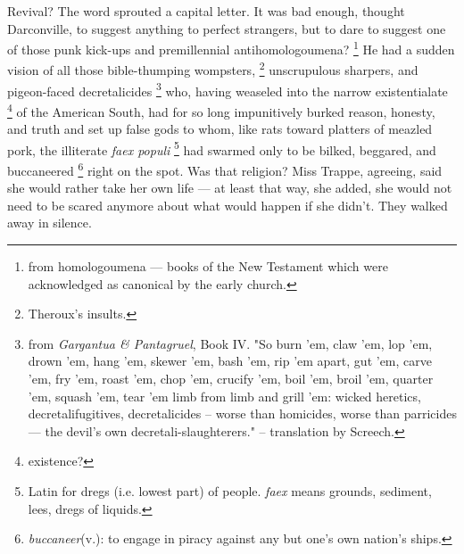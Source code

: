   Revival? The word sprouted a capital letter. It was bad enough, thought
Darconville, to suggest anything to perfect strangers, but to dare to suggest
one of those punk 
kick-ups and premillennial 
antihomologoumena? 
\footnote{ \textdbend from homologoumena --- books of the New Testament which 
  were acknowledged as canonical by the early church.}
He had a sudden vision of all those bible-thumping
wompsters, 
\footnote{ \textdbend Theroux's insults.}
unscrupulous 
sharpers, 
and pigeon-faced decretalicides 
\footnote{ from \textit{Gargantua \& Pantagruel}, Book IV. "So burn 'em, claw 
'em, lop 'em, drown 'em, hang 'em, skewer 'em, bash 'em, rip 'em apart, gut 'em, carve
'em, fry 'em, roast 'em, chop 'em, crucify 'em, boil 'em, broil 'em, quarter 'em,
squash 'em, tear 'em limb from limb and grill 'em: wicked heretics,
decretalifugitives, decretalicides -- worse than homicides, worse than parricides
--- the devil's own decretali-slaughterers." -- translation by Screech.}
who, having weaseled 
into the narrow existentialate
\footnote{\textdbend existence?}
of the American South, had for so long impunitively 
burked 
reason, honesty, and truth and set up false gods to whom, like rats toward platters 
of meazled 
pork, the illiterate \textit{faex populi}
\footnote{ Latin for dregs (i.e. lowest part) of people. \textit{faex} means
  grounds, sediment, lees, dregs of liquids.}
had swarmed only to be bilked, 
beggared, and buccaneered 
\footnote{ \textdbend \textit{buccaneer}(v.): to engage in piracy against 
  any but one's own nation's ships.}
right on the spot. Was that religion? Miss Trappe, agreeing, said
she would rather take her own life --- at least that way, she added, she would 
not need to be scared anymore about what would happen if she didn't. They walked
away in silence.

